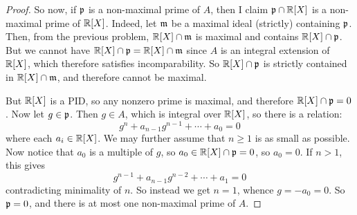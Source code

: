 \begin{proof}
	So now, if $\mathfrak{p}$ is a non-maximal prime of $A$, then I claim $\mathfrak{p} \cap \mathbb{R}[X]$ is a non-maximal prime of $\mathbb{R}[X]$. Indeed, let $\mathfrak{m}$ be a maximal ideal (strictly) containing $\mathfrak{p}$. Then, from the previous problem, $\mathbb{R}[X] \cap \mathfrak{m}$ is maximal and contains $\mathbb{R}[X] \cap \mathfrak{p}$. But we cannot have $\mathbb{R}[X] \cap \mathfrak{p} = \mathbb{R}[X] \cap \mathfrak{m}$ since $A$ is an integral extension of $\mathbb{R}[X]$, which therefore satisfies incomparability. So $\mathbb{R}[X] \cap \mathfrak{p}$ is strictly contained in $\mathbb{R}[X] \cap \mathfrak{m}$, and therefore cannot be maximal.
	
	But $\mathbb{R}[X]$ is a PID, so any nonzero prime is maximal, and therefore $\mathbb{R}[X] \cap \mathfrak{p} = 0$. Now let $g \in \mathfrak{p}$. Then $g \in A$, which is integral over $\mathbb{R}[X]$, so there is a relation:
	\[ g^n + a_{n-1}g^{n-1} + \cdots + a_0 = 0 \]
	where each $a_i \in \mathbb{R}[X]$. We may further assume that $n \geq 1$ is as small as possible. Now notice that $a_0$ is a multiple of $g$, so $a_0 \in \mathbb{R}[X] \cap \mathfrak{p} = 0$, so $a_0=0$. If $n > 1$, this gives
	\[ g^{n-1} + a_{n-1}g^{n-2} + \cdots + a_1 = 0 \]
	contradicting minimality of $n$. So instead we get $n=1$, whence $g = -a_0 = 0$. So $\mathfrak{p} = 0$, and there is at most one non-maximal prime of $A$.
\end{proof}
